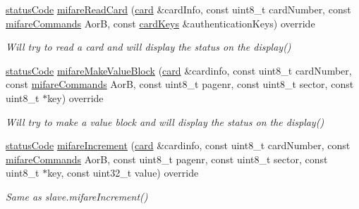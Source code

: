 \begin{DoxyCompactItemize}
\mbox{\label{classnfc_1_1NfcOled_abed1963a7aaaa03737ecc7893abfbb23}} 
\hyperlink{declarations_8h_ae1d20c5a38cae82ccaa6a77be3fd264b}{status\+Code} \hyperlink{classnfc_1_1NfcOled_abed1963a7aaaa03737ecc7893abfbb23}{mifare\+Read\+Card} (\hyperlink{classcard}{card} \&card\+Info, const uint8\+\_\+t card\+Number, const \hyperlink{declarations_8h_a305b1a3bcfca65e2a82f0f9d24676835}{mifare\+Commands} AorB, const \hyperlink{structnfc_1_1cardKeys}{card\+Keys} \&authentication\+Keys) override
\begin{DoxyCompactList}\small\item\em Will try to read a card and will display the status on the display() \end{DoxyCompactList}\item 
\mbox{\label{classnfc_1_1NfcOled_a51057bf2bceb99fafeeaec0589470efb}} 
\hyperlink{declarations_8h_ae1d20c5a38cae82ccaa6a77be3fd264b}{status\+Code} \hyperlink{classnfc_1_1NfcOled_a51057bf2bceb99fafeeaec0589470efb}{mifare\+Make\+Value\+Block} (\hyperlink{classcard}{card} \&cardinfo, const uint8\+\_\+t card\+Number, const \hyperlink{declarations_8h_a305b1a3bcfca65e2a82f0f9d24676835}{mifare\+Commands} AorB, const uint8\+\_\+t pagenr, const uint8\+\_\+t sector, const uint8\+\_\+t $\ast$key) override
\begin{DoxyCompactList}\small\item\em Will try to make a value block and will display the status on the display() \end{DoxyCompactList}\item 
\mbox{\label{classnfc_1_1NfcOled_aa7bca4b2b6aeb113b9346f74d5d8e4b7}} 
\hyperlink{declarations_8h_ae1d20c5a38cae82ccaa6a77be3fd264b}{status\+Code} \hyperlink{classnfc_1_1NfcOled_aa7bca4b2b6aeb113b9346f74d5d8e4b7}{mifare\+Increment} (\hyperlink{classcard}{card} \&cardinfo, const uint8\+\_\+t card\+Number, const \hyperlink{declarations_8h_a305b1a3bcfca65e2a82f0f9d24676835}{mifare\+Commands} AorB, const uint8\+\_\+t pagenr, const uint8\+\_\+t sector, const uint8\+\_\+t $\ast$key, const uint32\+\_\+t value) override
\begin{DoxyCompactList}\small\item\em Same as slave.\+mifare\+Increment() \end{DoxyCompactList}\item 
\mbox{\label{classnfc_1_1NfcOled_ab0a2321b094ce75503cde8f6bb7a91ef}} 

\end{DoxyCompactItemize}
